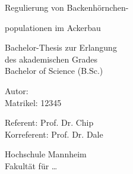 \begin{titlepage}

	\pagestyle{empty}

	\makeatletter
	\@extratitle
	\makeatother

	\newpage

	\makeatletter
	\makeatother

	\vspace*{55mm}
	\hspace{35mm}
	\begin{minipage}{130mm}
		\sffamily
		{\Large{}}
 		\par\vspace{0.5em}
 		{\Large Regulierung von Backenhörnchen-}
		\par\vspace{0.5em}
		{\Large populationen im Ackerbau}
	\end{minipage}

	\null\vfill

	\hspace{34mm}
	\begin{minipage}{130mm}
		\makeatletter
		\sflight
		\large
		Bachelor-Thesis zur Erlangung
		\\ des akademischen Grades
		\\ Bachelor of Science (B.Sc.)
		\par\bigskip
 		Autor: \@author \\
 		Matrikel: 12345
		\par\bigskip
		Referent: Prof. Dr. Chip \\
		Korreferent: Prof. Dr. Dale
		\par\bigskip
		Hochschule Mannheim \\
		Fakultät für \dots
		\par\bigskip
		\@date
		\makeatother
	\end{minipage}

	\newpage

	\makeatletter
	\@uppertitleback
	\null\vfill
	\@lowertitleback
	\makeatother

\end{titlepage}
